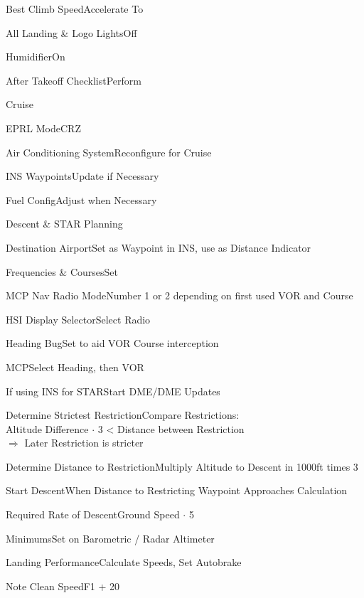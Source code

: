 \documentclass[sim-use, blue_items]{checklist}
\begin{document}
\begin{continuedchecklist}
	 {
		\item{Best Climb Speed}{Accelerate To}
		\item{All Landing \& Logo Lights}{Off}
		\item{Humidifier}{On}
		\item{After Takeoff Checklist}{Perform}
	}
\end{continuedchecklist}

\begin{checklist}{Cruise}
	 {
		\item{EPRL Mode}{CRZ}
		\item{Air Conditioning System}{Reconfigure for Cruise}
	}
	\item{INS Waypoints}{Update if Necessary}
	\item{Fuel Config}{Adjust when Necessary}
\end{checklist}

\begin{checklist}{Descent \& STAR Planning}
	\item{Destination Airport}{Set as Waypoint in INS, use as Distance Indicator}
	 {
		\item{Frequencies \& Courses}{Set}
		\item{MCP Nav Radio Mode}{Number 1 or 2 depending on first used VOR and Course}
		\item{HSI Display Selector}{Select Radio}
		\item{Heading Bug}{Set to aid VOR Course interception}
		\item{MCP}{Select Heading, then VOR}
	}
	\item{If using INS for STAR}{Start DME/DME Updates}
	 {
		\item{Determine Strictest Restriction}{Compare Restrictions:\\Altitude Difference $\cdot$ 3 < Distance between Restriction\\$\Rightarrow$ Later Restriction is stricter}
		\item{Determine Distance to Restriction}{Multiply Altitude to Descent in 1000ft times 3}
		\item{Start Descent}{When Distance to Restricting Waypoint Approaches Calculation}
		\item{Required Rate of Descent}{Ground Speed $\cdot$ 5}
	}
	\item{Minimums}{Set on Barometric / Radar Altimeter}
	\item{Landing Performance}{Calculate Speeds, Set Autobrake}
	\item{Note Clean Speed}{F1 + 20}
\end{checklist}
\end{document}

